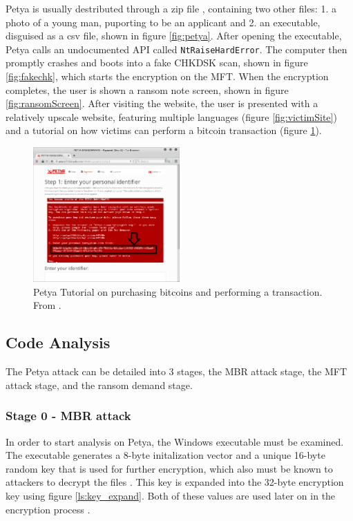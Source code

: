\documentclass[twocolumn]{article}
\newcommand{\code}[1]{\texttt{#1}}
\begin{document}
Petya is usually destributed through a zip file \cite{lowLevelPetya}, containing two other files: 1. a photo of a young man, puporting to be an applicant and 2. an executable, disguised as a csv file, shown in figure \ref{fig:petya}. 
After opening the executable, Petya calls an undocumented API called \code{NtRaiseHardError}. The computer then promptly crashes and boots into a fake CHKDSK scan, shown in figure \ref{fig:fakechk}, which starts the encryption on the MFT. When the encryption completes, the user is shown a ransom note screen, shown in figure \ref{fig:ransomScreen}. After visiting the website, the user is presented with a relatively upscale website, featuring multiple languages (figure \ref{fig:victimSite}) and a tutorial on how victims can perform a bitcoin transaction (figure \ref{fig:victimTutorial}). 
\begin{figure}
	\includegraphics[width = 0.5\textwidth]{victimTutorial.png}
	\caption{Petya Tutorial on purchasing bitcoins and performing a transaction. From \cite{lowLevelPetya}.}
	\label{fig:victimTutorial}
\end{figure}

\subsection{Code Analysis}
The Petya attack can be detailed into 3 stages, the MBR attack stage, the MFT attack stage, and the ransom demand stage.
\subsubsection{Stage 0 - MBR attack}
In order to start analysis on Petya, the Windows executable must be examined. The executable generates a 8-byte initalization vector and a unique 16-byte random key that is used for further encryption, which also must be known to attackers to decrypt the files \cite{lowLevelPetya}. This key is expanded into the 32-byte encryption key using figure \ref{ls:key_expand}. Both of these values are used later on in the encryption process \cite{decryptPetya}. 
\end{document}
